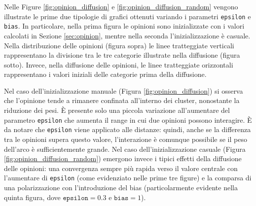 \documentclass[sigchi]{acmart}
\begin{document}
Nelle Figure \ref{fig:opinion_diffusion} e \ref{fig:opinion_diffusion_random} vengono illustrate le prime due tipologie di grafici ottenuti variando i parametri \texttt{epsilon} e \texttt{bias}. In particolare, nella prima figura le opinioni sono inizializzate con i valori calcolati in Sezione \ref{sec:opinion}, mentre nella seconda l'inizializzazione è casuale. Nella distribuzione delle opinioni (figura sopra) le linee tratteggiate verticali rappresentano la divisione tra le tre categorie illustrate nella diffusione (figura sotto). Invece, nella diffusione delle opinioni, le linee tratteggiate orizzontali rappresentano i valori iniziali delle categorie prima della diffusione.

Nel caso dell'inizializzazione manuale (Figura \ref{fig:opinion_diffusion}) si osserva che l'opinione tende a rimanere confinata all'interno dei cluster, nonostante la riduzione dei pesi. È presente solo una piccola variazione all'aumentare del parametro \texttt{epsilon} che aumenta il range in cui due opinioni possono interagire. È da notare che \texttt{epsilon} viene applicato alle distanze: quindi, anche se la differenza tra le opinioni supera questo valore, l'interazione è comunque possibile se il peso dell'arco è sufficientemente grande.
Nel caso dell'inizializzazione casuale (Figura \ref{fig:opinion_diffusion_random}) emergono invece i tipici effetti della diffusione delle opinioni: una convergenza sempre più rapida verso il valore centrale con l'aumentare di \texttt{epsilon} (come evidenziato nelle prime tre figure) e la comparsa di una polarizzazione con l'introduzione del bias (particolarmente evidente nella quinta figura, dove $\texttt{epsilon}=0.3$ e $\texttt{bias}=1$).
\end{document}
